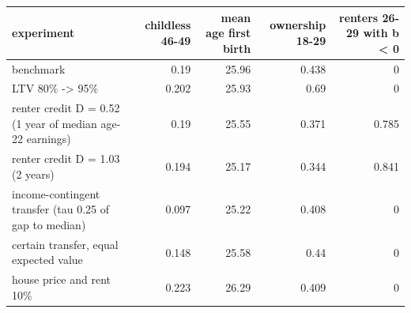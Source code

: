 \begin{tabular}{lrrrr}
\toprule
experiment & childless 46-49 & mean age first birth & ownership 18-29 & renters 26-29 with b < 0 \\
\midrule
benchmark & 0.19 & 25.96 & 0.438 & 0 \\
LTV 80\% -> 95\% & 0.202 & 25.93 & 0.69 & 0 \\
renter credit D = 0.52 (1 year of median age-22 earnings) & 0.19 & 25.55 & 0.371 & 0.785 \\
renter credit D = 1.03 (2 years) & 0.194 & 25.17 & 0.344 & 0.841 \\
income-contingent transfer (tau 0.25 of gap to median) & 0.097 & 25.22 & 0.408 & 0 \\
certain transfer, equal expected value & 0.148 & 25.58 & 0.44 & 0 \\
house price and rent 10\% & 0.223 & 26.29 & 0.409 & 0 \\
\bottomrule
\end{tabular}
